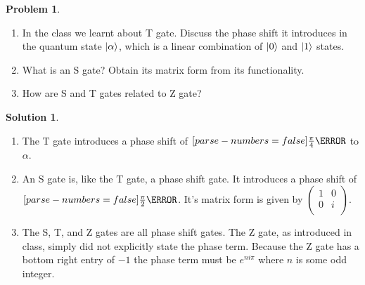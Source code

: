 \documentclass[10pt]{article}
\theoremstyle{definition}
\newtheorem{problem}{Problem}
\newtheorem{soln}{Solution}
\begin{document}
\begin{problem}~
\begin{enumerate}[label=(\roman*)]
  \item In the class we learnt about T gate. Discuss the phase shift it introduces in the quantum state
        $\ket{\alpha}$, which is a linear combination of $\ket{0}$ and $\ket{1}$ states.
  \item What is an S gate? Obtain its matrix form from its functionality.
  \item How are S and T gates related to Z gate?
\end{enumerate}
\end{problem}
\begin{soln}~
  \begin{enumerate}[label=(\roman*)]
    \item The T gate introduces a phase shift of $\qty[parse-numbers=false]{\frac{\pi}{4}}{\radian}$ to $\alpha$.
    \item An S gate is, like the T gate, a phase shift gate. It introduces a phase shift of
          $\qty[parse-numbers=false]{\frac{\pi}{2}}{\radian}$. It's matrix form is given by
          $\begin{pmatrix}
              1 & 0 \\
              0 & i \\
            \end{pmatrix}$.
    \item The S, T, and Z gates are all phase shift gates. The Z gate, as introduced in class, simply did not explicitly
          state the phase term. Because the Z gate has a bottom right entry of $-1$ the phase term must be $e^{ni\pi}$ where
          $n$ is some odd integer.
  \end{enumerate}
\end{soln}
\end{document}
